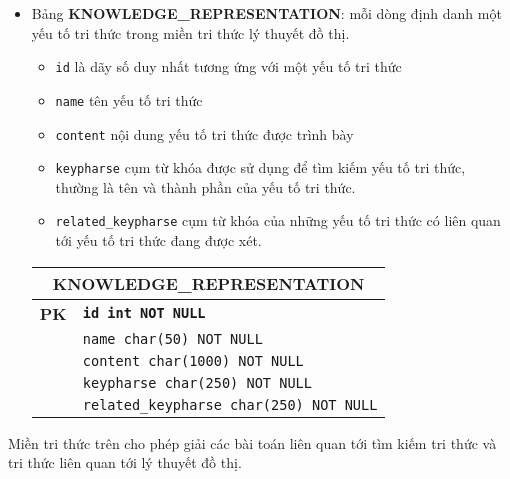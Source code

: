 \documentclass[a4paper]{article}
\begin{document}
	\begin{itemize}
		\item Bảng \textbf{\textbf{KNOWLEDGE\_REPRESENTATION}}: mỗi dòng định danh một yếu tố tri thức trong miền tri thức lý thuyết đồ thị.
		
		\begin{itemize}
			\item \texttt{id} là dãy số duy nhất tương ứng với một yếu tố tri thức 
			\item \texttt{name} tên yếu tố tri thức
			\item \texttt{content} nội dung yếu tố tri thức được trình bày
			\item \texttt{keypharse} cụm từ khóa được sử dụng để tìm kiếm yếu tố tri thức, thường là tên và thành phần của yếu tố tri thức.
			\item \texttt{related\_keypharse} cụm từ khóa của những yếu tố tri thức có liên quan tới yếu tố tri thức đang được xét.
		\end{itemize} 
		
		\begin{tabular}{|c|l|}
			\hline
			\multicolumn{2}{|c|}{\textbf{KNOWLEDGE\_REPRESENTATION}} \\
			\hline
			\textbf{PK} & \texttt{\textbf{id int NOT NULL}} \\
			\hline
			& \texttt{name char(50) NOT NULL} \\
			\hline
			& \texttt{content char(1000) NOT NULL} \\
			\hline
			& \texttt{keypharse char(250) NOT NULL} \\
			\hline
			& \texttt{related\_keypharse char(250) NOT NULL} \\
			\hline
		\end{tabular}
		
	\end{itemize}
	
	Miền tri thức trên cho phép giải các bài toán liên quan tới tìm kiếm tri thức và tri thức liên quan tới lý thuyết đồ thị.
	
	
\end{document}
